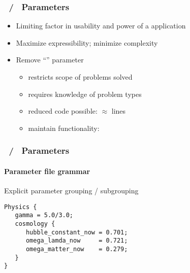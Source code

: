 \begin{frame}[fragile] 
\frametitle{\enzop\ / \cello\ Parameters}
\begin{itemize}
\item Limiting factor in usability and power of a application
\item Maximize expressibility; minimize complexity
\item Remove ``'' parameter
\begin{itemize}
\item   restricts scope of problems solved
\item   requires knowledge of problem types
\item reduced code possible:  $\approx$ lines 
\item maintain functionality: 
\end{itemize}
\end{itemize}
\end{frame}

\begin{frame}[fragile] 
\frametitle{\enzop\ / \cello\ Parameters}
\framesubtitle{Parameter file grammar}
Explicit parameter grouping / subgrouping
  \begin{block}{}\footnotesize{}
      \verb+Physics {+ \\
      \verb+   gamma = 5.0/3.0;+ \\
      \verb+   cosmology {+ \\
      \verb+      hubble_constant_now = 0.701;+ \\
      \verb+      omega_lamda_now     = 0.721;+ \\
      \verb+      omega_matter_now    = 0.279;+ \\
      \verb+   }+ \\
      \verb+}+
   \end{block}
\end{frame}

